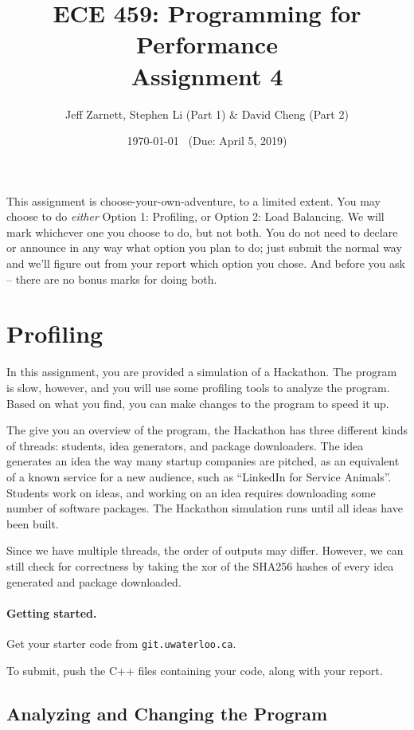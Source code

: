 \documentclass[letterpaper,10pt]{article}
\title{\bf ECE 459: Programming for Performance\\Assignment 4}
\author{Jeff Zarnett, Stephen Li (Part 1) \& David Cheng (Part 2)}
\date{\today ~ (Due: April 5, 2019)}
\begin{document}
\maketitle

This assignment is choose-your-own-adventure, to a limited extent. You may choose to do \textit{either} Option 1: Profiling, or Option 2: Load Balancing. We will mark whichever one you choose to do, but not both. You do not need to declare or announce in any way what option you plan to do; just submit the normal way and we'll figure out from your report which option you chose. And before you ask -- there are no bonus marks for doing both. 


\section{Profiling}

In this assignment, you are provided a simulation of a Hackathon. The program is slow, however, and you will use some profiling tools to analyze the program. Based on what you find, you can make changes to the program to speed it up. 

The give you an overview of the program, the Hackathon has three different kinds of threads: students, idea generators, and package downloaders. The idea generates an idea the way many startup companies are pitched, as an equivalent of a known service for a new audience, such as ``LinkedIn for Service Animals''. Students work on ideas, and working on an idea requires downloading some number of software packages. The Hackathon simulation runs until all ideas have been built.

Since we have multiple threads, the order of outputs may differ. However, we can still check for correctness by taking the xor of the SHA256 hashes of every idea generated and package downloaded.

\paragraph{Getting started.} Get your starter code from \texttt{git.uwaterloo.ca}.

To submit, push the C++ files containing your code, along with your report.

\subsection{Analyzing and Changing the Program}
\end{document}

